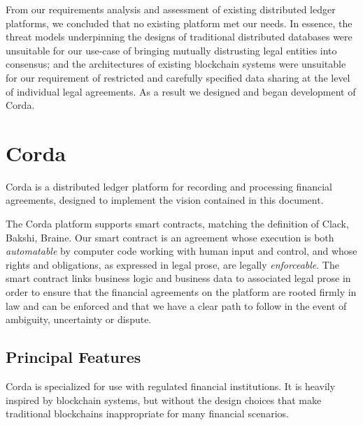 \documentclass{article}
\begin{document}
From our requirements analysis and assessment of existing distributed ledger platforms, we concluded that no existing platform met our needs.  In essence, the threat models underpinning the designs of traditional distributed databases were unsuitable for our use-case of bringing mutually distrusting legal entities into consensus; and the architectures of existing blockchain systems were unsuitable for our requirement of restricted and carefully specified data sharing at the level of individual legal agreements.  As a result we designed and began development of Corda.

\section{Corda}
Corda is a distributed ledger platform for recording and processing financial agreements, designed to implement the vision contained in this document.  

The Corda platform supports smart contracts, matching the definition of Clack, Bakshi, Braine.\cite{SCT}  Our smart contract is an agreement whose execution is both \textit{automatable} by computer code working with human input and control, and whose rights and obligations, as expressed in legal prose, are legally \textit{enforceable}.  The smart contract links business logic and business data to associated legal prose in order to ensure that the financial agreements on the platform are rooted firmly in law and can be enforced and that we have a clear path to follow in the event of ambiguity, uncertainty or dispute.

\subsection{Principal Features}
Corda is specialized for use with regulated financial institutions. It is heavily inspired by blockchain systems, but without the design choices that make traditional blockchains inappropriate for many financial scenarios. 
\end{document}
